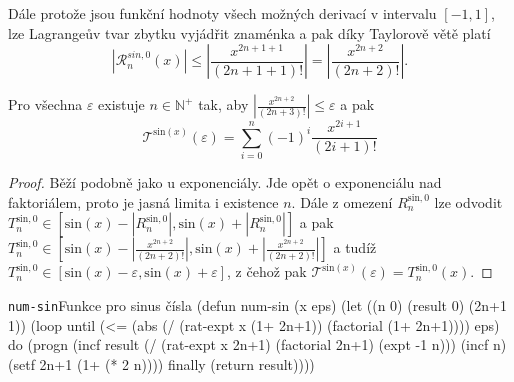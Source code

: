 Dále protože jsou funkční hodnoty všech možných derivací v intervalu $[-1,1]$, lze Lagrangeův tvar zbytku vyjádřit znaménka a pak díky Taylorově větě platí
\begin{equation}
\left|\mathcal{R}^{sin, 0}_n(x)\right|\leq\left|\frac{x^{2n+1+1}}{(2n+1+1)!}\right|=\left|\frac{x^{2n+2}}{(2n+2)!}\right|.
\end{equation}

\begin{consequence}
Pro všechna $\varepsilon$ existuje $n\in\mathbb{N}^+$ tak, aby $\left|\frac{x^{2n+2}}{(2n+3)!}\right| \leq \varepsilon$ a pak
\begin{equation}
\mathcal{T}^{\mathrm{sin}(x)}(\varepsilon)=\sum_{i=0}^n (-1)^i \frac{x^{2i+1}}{(2i+1)!}
\end{equation}
\begin{proof}
Běží podobně jako u exponenciály. Jde opět o exponenciálu nad faktoriálem, proto je jasná limita i existence $n$. Dále z omezení $R^{\mathrm{sin}, 0}_n$ lze odvodit $T^{\mathrm{sin}, 0}_n\in[\mathrm{sin}(x)-|R^{\mathrm{sin}, 0}_n|,\mathrm{sin}(x)+|R^{\mathrm{sin}, 0}_n|]$ a pak $T^{\mathrm{sin}, 0}_n\in[\mathrm{sin}(x)-|\frac{x^{2n+2}}{(2n+2)!}|,\mathrm{sin}(x)+|\frac{x^{2n+2}}{(2n+2)!}|]$ a tudíž $T^{\mathrm{sin}, 0}_n\in[\mathrm{sin}(x)-\varepsilon,\mathrm{sin}(x)+\varepsilon]$, z čehož pak $\mathcal{T}^{\mathrm{sin}(x)}(\varepsilon)=T^{\mathrm{sin},0}_n(x)$.
\end{proof}
\end{consequence}

\begin{lispcode}{\texttt{num-sin}}{Funkce pro sinus čísla}
(\textcolor{funkcionalni}{defun} \textcolor{pojmenovan}{num-sin} (x eps)
  (\textcolor{vedlejsi}{let} ((n 0) (result 0) (2n+1 1))
    (\textcolor{funkcionalni}{loop} 
      \textcolor{obarvi}{until} (\textcolor{matematicke}{<=} (\textcolor{matematicke}{abs} (\textcolor{matematicke}{/} (\textcolor{moje}{rat-expt} x (\textcolor{matematicke}{1+} 2n+1))
                        (\textcolor{moje}{factorial} (\textcolor{matematicke}{1+} 2n+1))))
                eps)
      \textcolor{obarvi}{do} (\textcolor{funkcionalni}{progn} 
          (\textcolor{vedlejsi}{incf} result
            (\textcolor{matematicke}{/} (\textcolor{moje}{rat-expt} x 2n+1)
               (\textcolor{moje}{factorial} 2n+1)
               (\textcolor{matematicke}{expt} -1 n)))
          (\textcolor{vedlejsi}{incf} n)
          (\textcolor{vedlejsi}{setf} 2n+1 (\textcolor{matematicke}{1+} (\textcolor{matematicke}{*} 2 n))))
      \textcolor{obarvi}{finally} (\textcolor{funkcionalni}{return} result))))
\end{lispcode}

